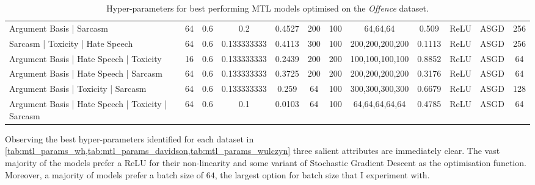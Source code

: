 \begin{landscape}
\begin{table}[]
{\begin{tabular}{l|ccccccccccc}
      Argument Basis | Sarcasm                          & 64         & 0.6              & 0.2              & 0.4527  & 200           & 100    & 64,64,64        & 0.509         & ReLU          & ASGD      & 256        \\
      Sarcasm | Toxicity | Hate Speech                  & 64         & 0.6              & 0.133333333      & 0.4113  & 300           & 100    & 200,200,200,200 & 0.1113        & ReLU          & ASGD      & 256        \\
      Argument Basis | Hate Speech | Toxicity           & 16         & 0.6              & 0.133333333      & 0.2439  & 200           & 200    & 100,100,100,100 & 0.8852        & ReLU          & ASGD      & 64         \\
      Argument Basis | Hate Speech | Sarcasm            & 64         & 0.6              & 0.133333333      & 0.3725  & 200           & 200    & 200,200,200,200 & 0.3176        & ReLU          & ASGD      & 64         \\
      Argument Basis | Toxicity | Sarcasm               & 64         & 0.6              & 0.133333333      & 0.259   & 64            & 100    & 300,300,300,300 & 0.6679        & ReLU          & ASGD      & 128        \\
      Argument Basis | Hate Speech | Toxicity | Sarcasm & 64         & 0.6              & 0.1              & 0.0103  & 64            & 100    & 64,64,64,64,64  & 0.4785        & ReLU          & ASGD      & 64
    \end{tabular}%
    }
    \caption{Hyper-parameters for best performing MTL models optimised on the \textit{Offence} dataset.}
    \label{tab:mtl_params_davidson}
  \end{table}
\end{landscape}

Observing the best hyper-parameters identified for each dataset in \cref{tab:mtl_params_wh,tab:mtl_params_davidson,tab:mtl_params_wulczyn} three salient attributes are immediately clear.
The vast majority of the models prefer a ReLU for their non-linearity and some variant of Stochastic Gradient Descent as the optimisation function.
Moreover, a majority of models prefer a batch size of $64$, the largest option for batch size that I experiment with.

